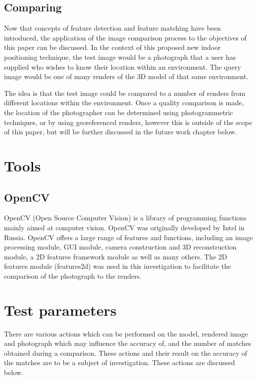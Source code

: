 \documentclass[11pt,a4paper]{report}
\begin{document}
		\subsection{Comparing}
			Now that concepts of feature detection and feature matching have been introduced, the application of the image comparison process to the objectives of this paper can be discussed.
			In the context of this proposed new indoor positioning technique, the test image would be a photograph that a user has supplied who wishes to know their location within an environment. The query image would be one of many renders of the 3D model of that same environment.
			
			The idea is that the test image could be compared to a number of renders from different locations within the environment. Once a quality comparison is made, the location of the photographer can be determined using photogrammetric techniques, or by using georeferenced renders, however this is outside of the scope of this paper, but will be further discussed in the future work chapter below.
	
	\section{Tools}
		\subsection{OpenCV}
			OpenCV (Open Source Computer Vision) is a library of programming functions mainly aimed at computer vision. OpenCV was originally developed by Intel in Russia. OpenCV offers a large range of features and functions, including an image processing module, GUI module, camera construction and 3D reconstruction module, a 2D features framework module as well as many others. The 2D features module (features2d) was used in this investigation to facilitate the comparison of the photograph to the renders. 

	\section{Test parameters}
	\label{test_parameters}
		There are various actions which can be performed on the model, rendered image and photograph which may influence the accuracy of, and the number of matches obtained during a comparison. These actions and their result on the accuracy of the matches are to be a subject of investigation. These actions are discussed below.
		
\end{document}
